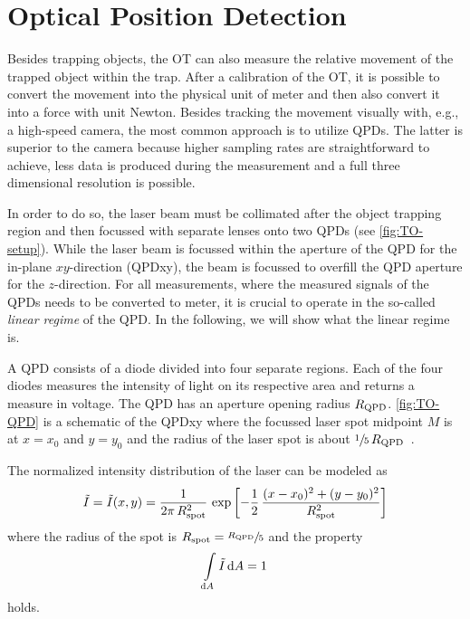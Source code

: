 \section{Optical Position Detection\label{sec:TO-QPD}}

Besides trapping objects, the OT can also measure the relative movement of the 
trapped object within the trap. After a calibration of the OT, it is possible 
to convert the movement into the physical unit of meter and then also convert 
it into a force with unit Newton. Besides tracking the movement visually with, 
e.g., a high-speed camera, the most common approach is to utilize QPDs. The 
latter is superior to the camera because higher sampling rates are 
straightforward to achieve, less data is produced during the measurement and a 
full three dimensional resolution is possible.

In order to do so, the laser beam must be collimated after the object trapping 
region and then focussed with separate lenses onto two QPDs (see 
\cref{fig:TO-setup}). While the laser beam is focussed within the aperture of 
the QPD for the in-plane $xy$-direction (QPDxy), the beam is focussed to 
overfill the QPD aperture for the $z$-direction. For all measurements, where 
the measured signals of the QPDs needs to be converted to meter, it is crucial 
to operate in the so-called \emph{linear regime} of the QPD. In the following, 
we will show what the linear regime is.

A QPD consists of a diode divided into four separate regions. Each of the four 
diodes measures the intensity of light on its respective area and returns a 
measure in voltage. The QPD has an aperture opening radius $R_{\mathrm{QPD}}$. 
\cref{fig:TO-QPD} is a schematic of the QPDxy where the focussed laser spot 
midpoint $M$ is at $x=x_{0}$ and $y=y_{0}$ and the radius of the laser spot is 
about $\sfrac{1}{5}\,R_{\mathrm{QPD}}$~\cite{Lamprecht2017}.

The normalized intensity distribution of the laser can be modeled as
\begin{equation}
  \tilde{I} = \tilde{I}(x, y) = 
  \frac{1}{2\pi\,R_{\mathrm{spot}}^{2}}\,\exp\left[ 
  -\frac{1}{2}\,\frac{(x-x_{0})^{2} + (y - y_{0})^{2}}{R_{\mathrm{spot}}^{2}} 
\right]
    \label{eq:TO-intensity}
\end{equation}
where the radius of the spot is $R_{\mathrm{spot}}=\sfrac{R_{\mathrm{QPD}}}{5}$ and the property 
\begin{equation}
  \int\limits_{\dd{A}}\tilde{I}\dd{A} = 1
\end{equation}
holds.

